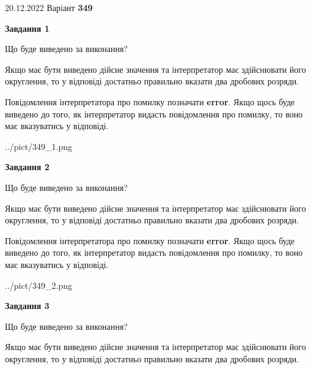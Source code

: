 \documentclass[12pt, ukrainian]{article}
\begin{document}
{20.12.2022 Варіант \No \textbf { 349 }\par}
{
\begin {Large}

{\begin {center}\textbf{Завдання 1}\end {center}}\par
Що буде виведено за виконання? \par

Якщо має бути виведено дійсне значення та інтерпретатор має здійснювати його округлення, 
то у відповіді достатньо правильно вказати два дробових розряди.

Повідомлення інтерпретатора про помилку позначати \textbf{error}.
Якщо щось буде виведено до того, як інтерпретатор видасть повідомлення про помилку, 
то воно має вказуватись у відповіді. \par

\begin{center}
	{../pict/349_1.png}
\end{center}
\newpage

{\begin {center}\textbf{Завдання 2}\end {center}}\par
Що буде виведено за виконання? \par

Якщо має бути виведено дійсне значення та інтерпретатор має здійснювати його округлення, 
то у відповіді достатньо правильно вказати два дробових розряди.

Повідомлення інтерпретатора про помилку позначати \textbf{error}.
Якщо щось буде виведено до того, як інтерпретатор видасть повідомлення про помилку, 
то воно має вказуватись у відповіді. \par

\begin{center}
	{../pict/349_2.png}
\end{center}
\newpage

{\begin {center}\textbf{Завдання 3}\end {center}}\par
Що буде виведено за виконання? \par

Якщо має бути виведено дійсне значення та інтерпретатор має здійснювати його округлення, 
то у відповіді достатньо правильно вказати два дробових розряди.


\end{Large}}
\end{document}
